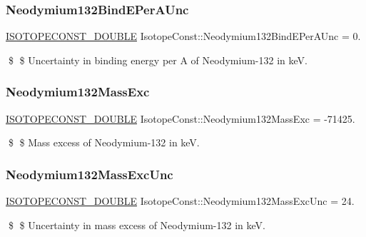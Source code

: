 \subsubsection{\texorpdfstring{Neodymium132\+Bind\+E\+Per\+A\+Unc}{Neodymium132BindEPerAUnc}}
{\footnotesize\ttfamily \mbox{\hyperlink{group___isotope_const-_macros_ga8f45a7272ce02c0b4c65c44636ed719a}{I\+S\+O\+T\+O\+P\+E\+C\+O\+N\+S\+T\+\_\+\+D\+O\+U\+B\+LE}} Isotope\+Const\+::\+Neodymium132\+Bind\+E\+Per\+A\+Unc = 0.}

\$ \$ Uncertainty in binding energy per A of Neodymium-\/132 in keV. \mbox{\label{group___isotope_const-_neodymium-_nd132_gab39c13c74c5a201062f4f89b1b75fefb}} 
\subsubsection{\texorpdfstring{Neodymium132\+Mass\+Exc}{Neodymium132MassExc}}
{\footnotesize\ttfamily \mbox{\hyperlink{group___isotope_const-_macros_ga8f45a7272ce02c0b4c65c44636ed719a}{I\+S\+O\+T\+O\+P\+E\+C\+O\+N\+S\+T\+\_\+\+D\+O\+U\+B\+LE}} Isotope\+Const\+::\+Neodymium132\+Mass\+Exc = -\/71425.}

\$ \$ Mass excess of Neodymium-\/132 in keV. \mbox{\label{group___isotope_const-_neodymium-_nd132_gaecc8c893f89feee78ea8b481b2591867}} 
\subsubsection{\texorpdfstring{Neodymium132\+Mass\+Exc\+Unc}{Neodymium132MassExcUnc}}
{\footnotesize\ttfamily \mbox{\hyperlink{group___isotope_const-_macros_ga8f45a7272ce02c0b4c65c44636ed719a}{I\+S\+O\+T\+O\+P\+E\+C\+O\+N\+S\+T\+\_\+\+D\+O\+U\+B\+LE}} Isotope\+Const\+::\+Neodymium132\+Mass\+Exc\+Unc = 24.}

\$ \$ Uncertainty in mass excess of Neodymium-\/132 in keV. \mbox{\label{group___isotope_const-_neodymium-_nd132_gad2d39515febb77b75336fcb59b96bb16}} 
